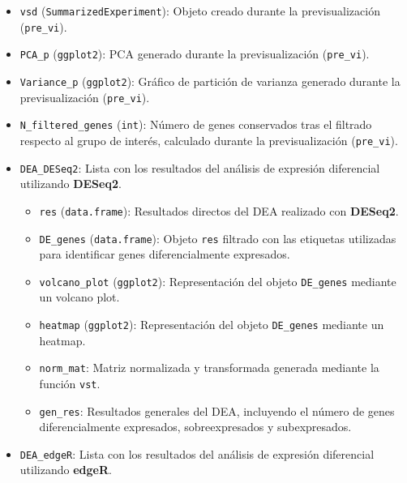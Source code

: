 \documentclass[
  9pt,
]{article}
\begin{document}
\begin{itemize}
\item
  \texttt{vsd} (\texttt{SummarizedExperiment}): Objeto creado durante la
  previsualización (\texttt{pre\_vi}).
\item
  \texttt{PCA\_p} (\texttt{ggplot2}): PCA generado durante la
  previsualización (\texttt{pre\_vi}).
\item
  \texttt{Variance\_p} (\texttt{ggplot2}): Gráfico de partición de
  varianza generado durante la previsualización (\texttt{pre\_vi}).
\item
  \texttt{N\_filtered\_genes} (\texttt{int}): Número de genes
  conservados tras el filtrado respecto al grupo de interés, calculado
  durante la previsualización (\texttt{pre\_vi}).
\item
  \texttt{DEA\_DESeq2}: Lista con los resultados del análisis de
  expresión diferencial utilizando \textbf{DESeq2}.

  \begin{itemize}
  \item
    \texttt{res} (\texttt{data.frame}): Resultados directos del DEA
    realizado con \textbf{DESeq2}.
  \item
    \texttt{DE\_genes} (\texttt{data.frame}): Objeto \texttt{res}
    filtrado con las etiquetas utilizadas para identificar genes
    diferencialmente expresados.
  \item
    \texttt{volcano\_plot} (\texttt{ggplot2}): Representación del objeto
    \texttt{DE\_genes} mediante un volcano plot.
  \item
    \texttt{heatmap} (\texttt{ggplot2}): Representación del objeto
    \texttt{DE\_genes} mediante un heatmap.
  \item
    \texttt{norm\_mat}: Matriz normalizada y transformada generada
    mediante la función \texttt{vst}.
  \item
    \texttt{gen\_res}: Resultados generales del DEA, incluyendo el
    número de genes diferencialmente expresados, sobreexpresados y
    subexpresados.
  \end{itemize}
\item
  \texttt{DEA\_edgeR}: Lista con los resultados del análisis de
  expresión diferencial utilizando \textbf{edgeR}.


\end{itemize}
\end{document}
